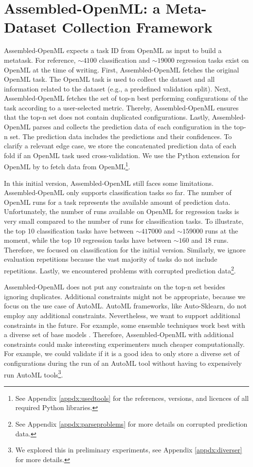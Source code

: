 \documentclass[11pt]{article}
\begin{document}
\section{Assembled-OpenML: a Meta-Dataset Collection Framework}
\label{sec:Assembled-OpenML}
Assembled-OpenML expects a task ID from OpenML as input to build a metatask. For reference, ${\sim} 4100$ classification and ${\sim} 19000$ regression tasks exist on OpenML at the time of writing. 
First, Assembled-OpenML fetches the original OpenML task. The OpenML task is used to collect the dataset and all information related to the dataset (e.g., a predefined validation split). 
Next, Assembled-OpenML fetches the set of top-n best performing configurations of the task according to a user-selected metric.  
Thereby, Assembled-OpenML ensures that the top-n set does not contain duplicated configurations. 
Lastly, Assembled-OpenML parses and collects the prediction data of each configuration in the top-n set.
The prediction data includes the predictions and their confidences. 
To clarify a relevant edge case, we store the concatenated prediction data of each fold if an OpenML task used cross-validation. 
We use the Python extension for OpenML by \cite{feurer-arxiv19a} to fetch data from OpenML\footnote{See Appendix \ref{appdx:usedtools} for the references, versions, and licences of all required Python libraries.}.

In this initial version, Assembled-OpenML still faces some limitations. 
Assembled-OpenML only supports classification tasks so far. 
The number of OpenML runs for a task represents the available amount of prediction data. 
Unfortunately, the number of runs available on OpenML for regression tasks is very small compared to the number of runs for classification tasks. To illustrate, the top 10 classification tasks have between ${\sim}417000$ and ${\sim}159000$ runs at the moment, while the top 10 regression tasks have between ${\sim}160$ and $18$ runs. 
Therefore, we focused on classification for the initial version. 
Similarly, we ignore evaluation repetitions because the vast majority of tasks do not include repetitions. 
Lastly, we encountered problems with corrupted prediction data\footnote{See Appendix \ref{appdx:parseproblems} for more details on corrupted prediction data.}. 

Assembled-OpenML does not put any constraints on the top-n set besides ignoring duplicates. Additional constraints might not be appropriate, because we focus on the use case of AutoML. AutoML frameworks, like Auto-Sklearn, do not employ any additional constraints. 
Nevertheless, we want to support additional constraints in the future. 
For example, some ensemble techniques work best with a diverse set of base models \citep{banfield2005ensemble}. 
Therefore, Assembled-OpenML with additional constraints could make interesting experimenters much cheaper computationally. 
For example, we could validate if it is a good idea to only store a diverse set of configurations during the run of an AutoML tool without having to expensively run AutoML tools\footnote{We explored this in preliminary experiments, see Appendix \ref{appdx:diverser} for more details.}. 
\end{document}
